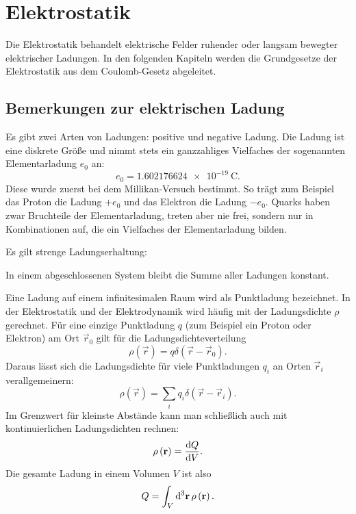 
\chapter{Elektrostatik}

Die Elektrostatik behandelt elektrische Felder ruhender oder langsam bewegter elektrischer Ladungen. In den folgenden Kapiteln werden die Grundgesetze der Elektrostatik aus dem Coulomb-Gesetz abgeleitet.

\section{Bemerkungen zur elektrischen Ladung}

Es gibt zwei Arten von Ladungen: positive und negative Ladung. Die Ladung ist eine diskrete Größe und nimmt stets ein ganzzahliges Vielfaches der sogenannten Elementarladung $e_{0}$ an:
\begin{equation*}
	e_{0}=\SI{1.602176624e-19}{\coulomb}.
\end{equation*}
Diese wurde zuerst bei dem Millikan-Versuch bestimmt. So trägt zum Beispiel das Proton die Ladung $+e_{0}$ und das Elektron die Ladung $-e_{0}$. Quarks haben zwar Bruchteile der Elementarladung, treten aber nie frei, sondern nur in Kombinationen auf, die ein Vielfaches der Elementarladung bilden.

Es gilt strenge Ladungserhaltung:
\begin{formal}
	In einem abgeschlossenen System bleibt die Summe aller Ladungen konstant.
\end{formal}
Eine Ladung auf einem infinitesimalen Raum wird als Punktladung bezeichnet. In der Elektrostatik und der Elektrodynamik wird häufig mit der Ladungsdichte $\rho $ gerechnet. Für eine einzige Punktladung $q$ (zum Beispiel ein Proton oder Elektron) am Ort $\vec {r}_{0}$ gilt für die Ladungsdichteverteilung
\begin{equation*}
	\rho \left(\vec {r}\right)=q\delta \left(\vec {r}-\vec {r}_{0}\right).
\end{equation*}
Daraus lässt sich die Ladungsdichte für viele Punktladungen $q_{i}$ an Orten $\vec {r}_{i}$ verallgemeinern:
\begin{equation*}
	\rho \left(\vec {r}\right)=\sum _{i}q_{i}\delta \left(\vec {r}-\vec {r}_{i}\right).
\end{equation*}
Im Grenzwert für kleinste Abstände kann man schließlich auch mit kontinuierlichen Ladungsdichten rechnen:
\begin{equation*}
	\rho \left(\vec {r}\right)=\frac{\diff Q}{\diff V}.
\end{equation*}
Die gesamte Ladung in einem Volumen $V$ ist also
\begin{equation*}
	Q=\int _{V}\diffa[3]{\vec{r}}\rho \left(\vec {r}\right).
\end{equation*}



